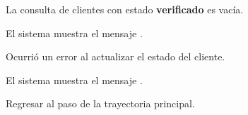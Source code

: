 {\begin{trayectoriaAlternativa}
    \item La consulta de clientes con estado \textbf{verificado} es vacía.

    \item El sistema muestra el mensaje
      .

  \end{trayectoriaAlternativa}

  \begin{trayectoriaAlternativa}
    {Ocurrió un error al actualizar el estado del cliente.}

    \item El sistema muestra el mensaje
      .

    \item Regresar al paso  de la
      trayectoria principal.

  \end{trayectoriaAlternativa}
}
